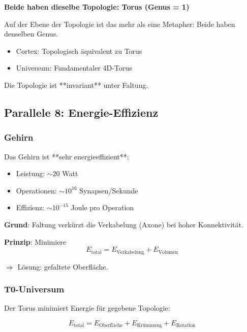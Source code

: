 	\begin{keyresult}
		\textbf{Beide haben dieselbe Topologie: Torus (Genus = 1)}

		Auf der Ebene der Topologie ist das mehr als eine Metapher: Beide haben denselben Genus.

		\begin{itemize}
			\item Cortex: Topologisch äquivalent zu Torus
			\item Universum: Fundamentaler 4D-Torus
		\end{itemize}

		Die Topologie ist **invariant** unter Faltung.
	\end{keyresult}

	\subsection{Parallele 8: Energie-Effizienz}

	\subsubsection{Gehirn}

	Das Gehirn ist **sehr energieeffizient**:

	\begin{itemize}
		\item Leistung: $\sim 20$ Watt
		\item Operationen: $\sim 10^{16}$ Synapsen/Sekunde
		\item Effizienz: $\sim 10^{-15}$ Joule pro Operation
	\end{itemize}

	\textbf{Grund}: Faltung verkürzt die Verkabelung (Axone) bei hoher Konnektivität.

	\textbf{Prinzip}: Minimiere
	\begin{equation}
		E_{\text{total}} = E_{\text{Verkabelung}} + E_{\text{Volumen}}
	\end{equation}

	$\Rightarrow$ Lösung: gefaltete Oberfläche.

	\subsubsection{T0-Universum}

	Der Torus minimiert Energie für gegebene Topologie:

	\begin{equation}
		E_{\text{total}} = E_{\text{Oberfläche}} + E_{\text{Krümmung}} + E_{\text{Rotation}}
	\end{equation}

